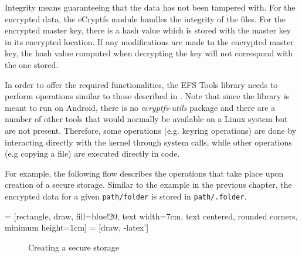 Integrity means guaranteeing that the data has not been tampered with. For the encrypted data, the eCryptfs module handles the integrity of the files. For the encrypted master key, there is a hash value which is stored with the master key in its encrypted location. If any modifications are made to the encrypted master key, the hash value computed when decrypting the key will not correspond with the one stored.

In order to offer the required functionalities, the EFS Tools library needs to perform operations similar to those described in . Note that since the library is meant to run on Android, there is no \textit{ecryptfs-utils} package and there are a number of other tools that would normally be available on a Linux system but are not present. Therefore, some operations (e.g. keyring operations) are done by interacting directly with the kernel through system calls, while other operations (e.g copying a file) are executed directly in code.

For example, the following flow describes the operations that take place upon creation of a secure storage. Similar to the example in the previous chapter, the encrypted data for a given \texttt{path/folder} is stored in \texttt{path/.folder}.

 = [rectangle, draw, fill=blue!20, 
    text width=7cm, text centered, rounded corners, minimum height=1cm]
 = [draw, -latex']

\begin{figure}[!h]
\centering 
{}
\caption{Creating a secure storage}
\label{fig:create-storage-multi-user}
\end{figure}

